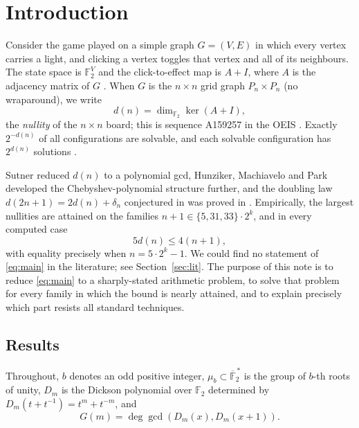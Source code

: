 \documentclass[a4paper]{article}
\theoremstyle{definition}
\newcommand{\F}{\mathbb{F}}
\begin{document}
	\section{Introduction}
	Consider the game played on a simple graph $G = (V, E)$ in which every vertex carries a light, and clicking a vertex toggles that vertex and all of its neighbours.
	The state space is $\F_2^V$ and the click-to-effect map is $A + I$, where $A$ is the adjacency matrix of $G$ \cite{Sutner1989}.
	When $G$ is the $n \times n$ grid graph $P_n \times P_n$ (no wraparound), we write
	\begin{equation*}
		d(n) = \dim_{\F_2} \ker (A + I),
	\end{equation*}
	the \emph{nullity} of the $n \times n$ board; this is sequence A159257 in the OEIS \cite{OEISA159257}.
	Exactly $2^{-d(n)}$ of all configurations are solvable, and each solvable configuration has $2^{d(n)}$ solutions \cite{Sutner1989}.

	Sutner \cite{Sutner96sigma-automataand} reduced $d(n)$ to a polynomial gcd, Hunziker, Machiavelo and Park \cite{HUNZIKER2004465} developed the Chebyshev-polynomial structure further, and the doubling law $d(2n+1) = 2 d(n) + \delta_n$ conjectured in \cite{Sutner1989} was proved in \cite{Boyles2022}.
	Empirically, the largest nullities are attained on the families $n + 1 \in \{5, 31, 33\} \cdot 2^{k}$, and in every computed case
	\begin{equation}\label{eq:main}
		5 d(n) \leq 4(n+1),
	\end{equation}
	with equality precisely when $n = 5 \cdot 2^k - 1$.
	We could find no statement of \eqref{eq:main} in the literature; see Section~\ref{sec:lit}.
	The purpose of this note is to reduce \eqref{eq:main} to a sharply-stated arithmetic problem, to solve that problem for every family in which the bound is nearly attained, and to explain precisely which part resists all standard techniques.

	\subsection{Results}
	Throughout, $b$ denotes an odd positive integer, $\mu_b \subset \overline{\F}_2^{\,*}$ is the group of $b$-th roots of unity, $D_m$ is the Dickson polynomial over $\F_2$ determined by $D_m(t + t^{-1}) = t^m + t^{-m}$, and
	\begin{equation*}
		G(m) = \deg \gcd \left( D_m(x), D_m(x+1) \right).
	\end{equation*}
\end{document}
